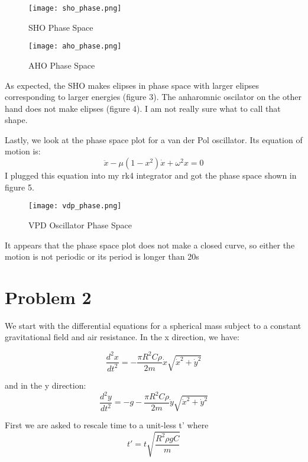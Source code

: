 \documentclass{article}
\begin{document}
\begin{figure}
    \centering
    \texttt{[image: sho\_phase.png]}
    \caption{SHO Phase Space}
    \label{fig:3}
\end{figure}

\begin{figure}
    \centering
    \texttt{[image: aho\_phase.png]}
    \caption{AHO Phase Space}
    \label{fig:4}
\end{figure}


As expected, the SHO makes elipses in phase space with larger elipses corresponding to larger energies (figure 3). The anharomnic oscilator on the other hand does not make elipses (figure 4). I am not really sure what to call that shape.

Lastly, we look at the phase space plot for a van der Pol oscillator. Its equation of motion is:
\begin{equation}
    \ddot{x}-\mu(1-x^2)\dot{x}+\omega^2 x=0
\end{equation}
I plugged this equation into my rk4 integrator and got the  phase space shown in figure 5.

\begin{figure}
    \centering
    \texttt{[image: vdp\_phase.png]}
    \caption{VPD Oscillator Phase Space}
    \label{fig:enter-label}
\end{figure}
It appears that the phase space plot does not make a closed curve, so either the motion is not periodic or its period is longer than 20s


\section{Problem 2}

We start with the differential equations for a spherical mass subject to  a constant gravitational field and air resistance. In the x direction, we have:

\begin{equation}
    \frac{d^2x}{dt^2}=-\frac{\pi R^2 C\rho}{2m}\dot{x}\sqrt{\dot{x}^2+\dot{y}^2}
\end{equation}

and in the y direction:
\begin{equation}
    \frac{d^2y}{dt^2} =-g- \frac{\pi R^2C\rho}{2m} \dot{y}\sqrt{\dot{x}^2+\dot{y}^2}
\end{equation}

First we are asked to rescale time to a unit-less t' where 
\begin{equation}
    t'=t \sqrt{\frac{R^2 \rho g C}{m}}
\end{equation}
\end{document}
